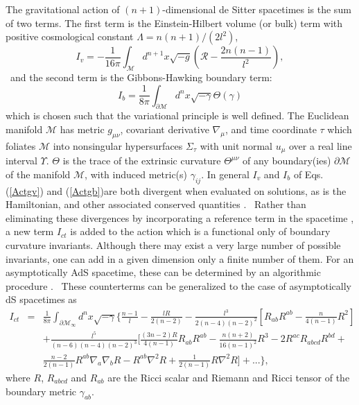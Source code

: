 \documentclass[a4paper,12pt,onecolumn]{revtex4}
\begin{document}
The gravitational action of $(n+1)$-dimensional de Sitter spacetimes is the
sum of two terms. The first term is the Einstein-Hilbert volume (or bulk)
term with positive cosmological constant $\Lambda =n(n+1)/(2l^2)$,
\begin{equation}
I_v=-\frac 1{16\pi }\int_{\mathcal{M}}d^{n+1}x\sqrt{-g}\left( \mathcal{R}-%
\frac{2n(n-1)}{l^2}\right) ,  \label{Actgv}
\end{equation}
\ and the second term is the Gibbons-Hawking boundary term:
\begin{equation}
I_b=\frac 1{8\pi }\int_{\partial \mathcal{M}}d^nx\sqrt{-\gamma }\Theta
(\gamma )  \label{Actgb}
\end{equation}
which is chosen such that the variational principle is well
defined. The Euclidean manifold $\mathcal{M}$ has metric $g_{\mu
\nu }$, covariant
derivative $\nabla _\mu $, and time coordinate $\tau $ which foliates $%
\mathcal{M}$ into nonsingular hypersurfaces $\Sigma _\tau $ with
unit normal $u_\mu $ over a real line interval $\Upsilon $.
$\Theta $ is the
trace of the extrinsic curvature $\Theta ^{\mu \nu }$ of any boundary(ies) $%
\partial \mathcal{M}$ of the manifold $\mathcal{M}$, with induced metric(s) $%
\gamma _{ij}$. In general $I_v$ and $I_b$ of Eqs. (\ref{Actgv})
and (\ref {Actgb})are both divergent when evaluated on solutions,
as is the Hamiltonian, and other associated conserved quantities
\cite{BY,BCM}. \ Rather than eliminating these divergences by
incorporating a reference term in the spacetime \cite{BCM,ivan}, a
new term $I_{ct}$ is added to the action which is a functional
only of boundary curvature invariants. Although there may exist a
very large number of possible invariants, one can add in a given
dimension only a finite number of them. For an asymptotically AdS
spacetime, these can be determined by an algorithmic procedure
\cite{kls}. \ These counterterms can be generalized to the case of
asymptotically dS spacetimes as
\begin{eqnarray}
I_{ct} &=&\frac 1{8\pi }\int_{\partial \mathcal{M}_\infty }d^nx\sqrt{-\gamma
}\{\frac{n-1}l-\frac{lR}{2(n-2)}-\frac{l^3}{2(n-4)(n-2)^2}[%
R_{ab}R^{ab}-\frac n{4(n-1)}R^2]  \nonumber \\
&& +\frac{l^5}{(n-6)(n-4)(n-2)^3}[\frac{(3n-2)R}{4(n-1)}%
R_{ab}R^{ab}-\frac{n(n+2)}{16(n-1)^2}R^3-2R^{ac}R_{abcd}R^{bd}+  \nonumber \\
&& \frac{n-2}{2(n-1)}R^{ab}\nabla _a\nabla _bR-R^{ab}\nabla
^2R+\frac 1{2(n-1)}R\nabla ^2R]+...\}, \label{Actct}
\end{eqnarray}
where $R$, $R_{abcd}$ and $R_{ab}$ are the Ricci scalar and
Riemann and Ricci tensor of the boundary metric $\gamma _{ab}$.
\end{document}
